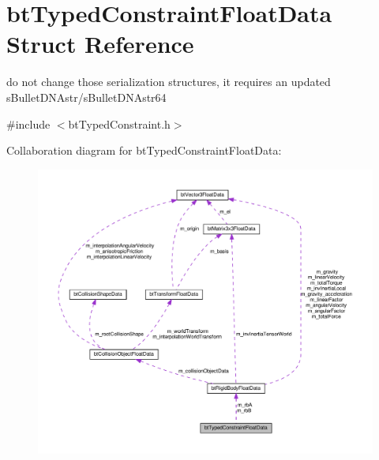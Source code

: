 \hypertarget{structbtTypedConstraintFloatData}{}\section{bt\+Typed\+Constraint\+Float\+Data Struct Reference}
\label{structbtTypedConstraintFloatData}


do not change those serialization structures, it requires an updated s\+Bullet\+D\+N\+Astr/s\+Bullet\+D\+N\+Astr64  




{\ttfamily \#include $<$bt\+Typed\+Constraint.\+h$>$}



Collaboration diagram for bt\+Typed\+Constraint\+Float\+Data\+:
\nopagebreak
\begin{figure}[H]
\begin{center}
\leavevmode
\includegraphics[width=350pt]{structbtTypedConstraintFloatData__coll__graph}
\end{center}
\end{figure}
